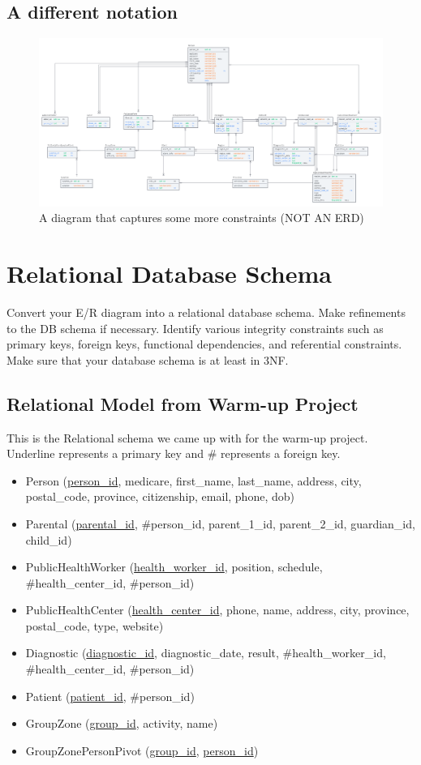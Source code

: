 \documentclass{article}
\begin{document}
\subsection{A different notation}
\begin{figure}[H]
    \centering
    \includegraphics[scale=0.34]{imgs/nOtAnErD.png}
    \caption{A diagram that captures some more constraints (NOT AN ERD)}
\end{figure}
\newpage

\section{Relational Database Schema}
Convert your E/R diagram into a relational database schema. Make refinements to
the DB schema if necessary. Identify various integrity constraints such as primary
keys, foreign keys, functional dependencies, and referential constraints. Make sure
that your database schema is at least in 3NF.

\subsection{Relational Model from Warm-up Project}
This is the Relational schema we came up with for the warm-up project. Underline represents a primary key and \# represents a foreign key.
\begin{itemize}
    \item Person (\underline{person\_id}, medicare, first\_name, last\_name, address, city, postal\_code, province, citizenship, email, phone, dob)
    \item Parental (\underline{parental\_id}, \#person\_id, parent\_1\_id, parent\_2\_id, guardian\_id, child\_id)
    \item PublicHealthWorker (\underline{health\_worker\_id}, position, schedule,  \#health\_center\_id, \#person\_id)
    \item PublicHealthCenter (\underline{health\_center\_id}, phone, name, address, city, province, postal\_code, type, website)
    \item Diagnostic (\underline{diagnostic\_id}, diagnostic\_date, result, \#health\_worker\_id, \#health\_center\_id, \#person\_id)
    \item Patient (\underline{patient\_id}, \#person\_id)
    \item GroupZone (\underline{group\_id}, activity, name)
    \item GroupZonePersonPivot (\underline{group\_id}, \underline{person\_id})
\end{itemize}
\end{document}
